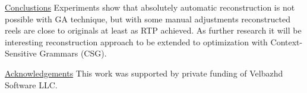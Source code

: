 \documentclass{article}
\begin{document}
\underline{Conclustions} Experiments show that absolutely automatic reconstruction is not possible with GA technique, but with some manual adjustments reconstructed reels are close to originals at least as RTP achieved. As further research it will be interesting reconstruction approach to be extended to optimization with Context-Sensitive Grammars (CSG).
\vspace*{5mm}

\underline{Acknowledgements} This work was supported by private funding of Velbazhd Software LLC.
\end{document}
